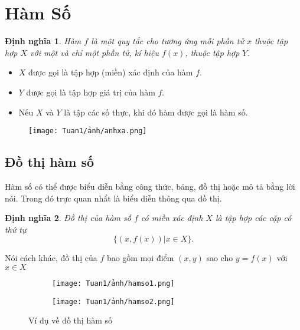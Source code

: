 \newtheorem{definition}{Định nghĩa}[section]    
\newtheorem{theorem}{Định lý}
\newtheorem{corollary}[theorem]{Hệ quả}
\newtheorem{lemma}[theorem]{Bổ đề}

\section{Hàm Số}    
\begin{definition}
Hàm $f$ là một quy tắc cho tương ứng mỗi phần tử $x$ thuộc tập hợp $X$ với một và chỉ một phần tử, kí hiệu $f(x)$, thuộc tập hợp $Y$.
\end{definition}    
\begin{itemize}
    \item $X$ được gọi là tập hợp (miền) xác định của hàm $f$.    
    \item $Y$ được gọi là tập hợp giá trị của hàm $f$. 
    \item Nếu $X$ và $Y$ là tập các số thực, khi đó hàm được gọi là hàm số.
\end{itemize}

\begin{figure}[htbp]
    \centering
    \texttt{[image: Tuan1/ảnh/anhxa.png]}\label{anh1.1}
\end{figure}
\subsection{Đồ thị hàm số}
Hàm số có thể được biểu diễn bằng công thức, bảng, đồ thị hoặc mô tả bằng lời nói. Trong đó trực quan nhẩt là biểu diễn thông qua đồ thị. 
\begin{definition}
    Đồ thị của hàm số $f$ có miền xác định $X$ là tập hợp các cặp có thứ tự  \[ \{\left(x,f(x)\right)\vert x\in X \} .\] 
\end{definition}
Nói cách khác, đồ thị của $f$ bao gồm mọi điểm $(x,y)$ sao cho $y=f(x)$ với $x\in X$
\begin{figure}[htbp]
    \centering
    \begin{subfigure}{0.4\textwidth}
        \centering
        \texttt{[image: Tuan1/ảnh/hamso1.png]}
        \caption{}
    \end{subfigure}
    \hfill
    \begin{subfigure}{0.5\textwidth}
        \centering
        \texttt{[image: Tuan1/ảnh/hamso2.png]}
        \caption{}
    \end{subfigure}
    \caption{Ví dụ về đồ thị hàm số}\label{anh1.2}
    \end{figure}

